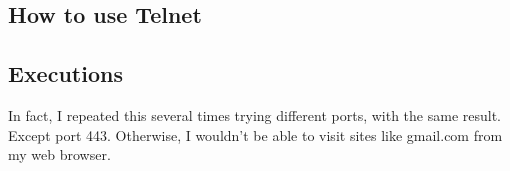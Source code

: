 \subsection{How to use Telnet}



\subsection{Executions}


In fact, I repeated this several times trying different ports, with the same result. Except port 443. Otherwise, I wouldn't be able to visit sites like gmail.com from my web browser.


